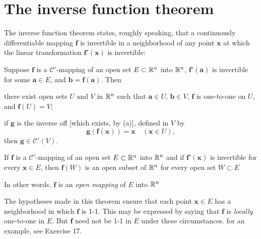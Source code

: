 \section{The inverse function theorem}

The inverse function theorem states, roughly speaking, that a continuously
differentiable mapping $\mathbf{f}$ is invertible in a neighborhood of any point $\mathbf{x}$ at which
the linear transformation $\mathbf{f'(x)}$ is invertible:

\begin{thm}
    \label{thm:9.24}
    Suppose $\mathbf{f}$ is a $\mathscr{C}'$-mapping of an open set $E \subset {\protect\mathbb R}^n$ into ${\protect\mathbb R}^n$, 
    $\mathbf{f'(a)}$ is invertible for some $\mathbf{a} \in E$, 
    and $\mathbf{b = f(a)}$. Then
    \begin{asparaenum}[(a)]
        \item there exist open sets $U$ and $V$ in ${\protect\mathbb R}^n$ 
        such that $\mathbf{a} \in U$, $\mathbf{b} \in V$, 
        $\mathbf{f}$ is one-to-one on $U$, and $\mathbf{f}(U) = V$;
        \item if $\mathbf{g}$ is the inverse off [which exists, by (a)], defined in $V$ by
        \begin{equation*}
            \mathbf{g(f(x)) = x}
            \quad
            (\mathbf{x} \in U),
        \end{equation*}
        then $\mathbf{g} \in \mathscr{C}'(V)$.
    \end{asparaenum}
\end{thm}



\begin{thm}
    \label{thm:9.25}
    If $\mathbf{f}$ is a $\mathscr{C}'$-mapping of an open set $E \subset {\protect\mathbb R}^n$ into ${\protect\mathbb R}^n$ 
    and if $\mathbf{f'(x)}$ is invertible for every $\mathbf{x} \in E$, 
    then $\mathbf{f}(W)$ is an open subset of ${\protect\mathbb R}^n$ for every open set
    $W \subset E$
\end{thm}

In other words, $\mathbf{f}$ is an \emph{open mapping} of $E$ into ${\protect\mathbb R}^n$

The hypotheses made in this theorem ensure that each point $\mathbf{x} \in E$ has a
neighborhood in which $\mathbf{f}$ is 1-1. 
This may be expressed by saying that $\mathbf{f}$ is
\emph{locally} one-to-one in $E$. 
But $\mathbf{f}$ need not be 1-1 in $E$ under these circumstances.
for an example, see Exercise 17.